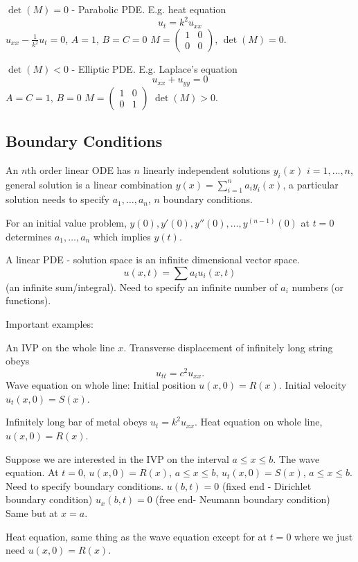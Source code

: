 \documentclass[10pt, a4paper]{article}
\begin{document}
$\det(M) = 0$ - Parabolic PDE.
E.g.
heat equation
\[
u_t = k ^ 2u_{xx}
\]
$u_{xx} - \frac{1}{k ^ 2}u_t = 0$,
$A = 1$,
$B = C = 0$
$M = \begin{pmatrix}
    1 & 0 \\ 0 & 0
\end{pmatrix}$,
$\det(M) = 0$.

$\det(M) < 0$ - Elliptic PDE.
E.g.
Laplace's equation
\[
u_{xx} + u_{yy} = 0
\]
$A = C = 1$,
$B = 0$
$M = \begin{pmatrix}
    1 & 0 \\ 0 & 1
\end{pmatrix}$
$\det(M) > 0$.

\subsection{Boundary Conditions}
An $n$th order linear ODE has $n$ linearly independent solutions $y_i(x)$ $i = 1, \dotsc, n$,
general solution is a linear combination $y(x) = \sum_{i = 1}^{n}a_iy_i(x)$,
a particular solution needs to specify $a_1, \dotsc, a_n$,
$n$ boundary conditions.

For an initial value problem,
$y(0), y'(0), y''(0), \dotsc, y ^ {(n - 1)}(0)$ at $t = 0$ determines $a_1, \dotsc, a_n$ which implies $y(t)$.

A linear PDE - solution space is an infinite dimensional vector space.
\[
u(x, t) = \sum a_iu_i(x, t)
\]
(an infinite sum/integral).
Need to specify an infinite number of $a_i$ numbers
(or functions).

Important examples:

An IVP on the whole line $x$.
Transverse displacement of infinitely long string obeys
\[
u_{tt} = c ^ 2u_{xx}.
\]
Wave equation on whole line:
Initial position $u(x, 0) = R(x)$.
Initial velocity $u_t(x, 0) = S(x)$.

Infinitely long bar of metal obeys $u_t = k ^ 2u_{xx}$.
Heat equation on whole line,
$u(x, 0) = R(x)$.

Suppose we are interested in the IVP on the interval $a \leq x \leq b$.
The wave equation.
At $t = 0$,
$u(x, 0) = R(x)$,
$a \leq x \leq b$,
$u_t(x, 0) = S(x)$,
$a \leq x \leq b$.
Need to specify boundary conditions.
$u(b, t) = 0$
(fixed end - Dirichlet boundary condition)
$u_x(b, t) = 0$
(free end- Neumann boundary condition)
Same but at $x = a$.


Heat equation,
same thing as the wave equation except for at $t = 0$ where we just need $u(x, 0) = R(x)$.
\end{document}
